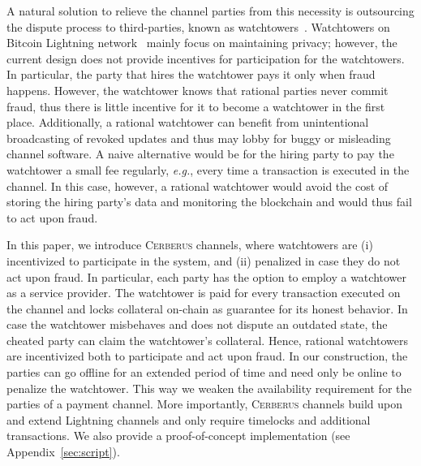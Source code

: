 \documentclass[runningheads]{llncs}
\newcommand{\eg}{{\em e.g.}}
\newcommand{\sys}{\textsc{Cerberus}\xspace}
\begin{document}
A natural solution to relieve the channel parties from this necessity is outsourcing the dispute process to third-parties, known as watchtowers~\cite{watchtowers,dryja2016monitors}. 
Watchtowers on Bitcoin Lightning network~\cite{poon2015lightning} mainly focus on maintaining privacy; however, the current design does not provide incentives for participation for the watchtowers. 
In particular, the party that hires the watchtower pays it only when fraud happens. However, the watchtower knows that rational parties never commit fraud, thus there is little incentive for it to become a watchtower in the first place. Additionally, a rational watchtower can benefit from unintentional broadcasting of revoked updates and thus may lobby for buggy or misleading channel software. A naive alternative would be for the hiring party to pay the watchtower a small fee regularly, \eg, every time a transaction is executed in the channel. In this case, however, a rational watchtower would avoid the cost of storing the hiring party's data and monitoring the blockchain and would thus fail to act upon fraud.

In this paper, we introduce \sys channels, where watchtowers are (i) incentivized to participate in the system, and (ii) penalized in case they do not act upon fraud. 
In particular,
each party has the option to employ a watchtower as a service provider. The watchtower  is paid for every transaction executed on the channel and locks collateral on-chain as guarantee for its honest behavior. In case the watchtower misbehaves and does not dispute an outdated state, the cheated party can claim the watchtower's collateral. 
Hence, rational watchtowers are incentivized both to participate and act upon fraud. 
In our construction, the parties can go offline for an extended period of time and need only be online to penalize the watchtower. 
This way we weaken the availability requirement for the parties of a payment channel. 
More importantly, \sys channels build upon and extend Lightning channels and only require timelocks and additional transactions.%
We also provide a proof-of-concept implementation (see Appendix~\ref{sec:script}).
\end{document}
